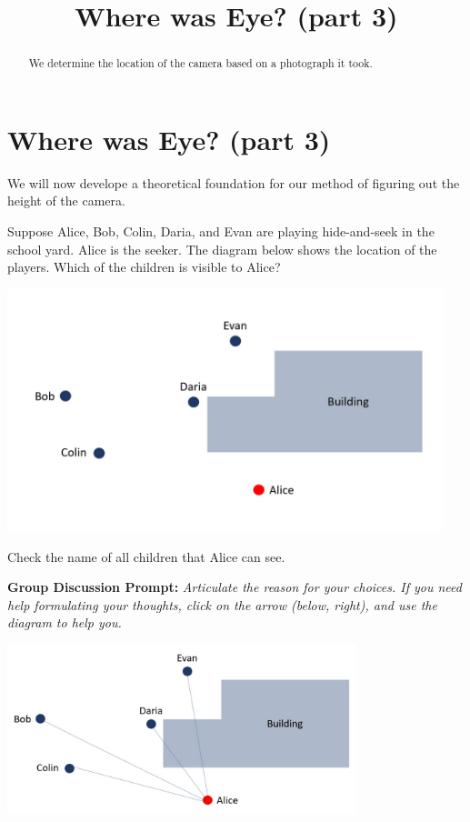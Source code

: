 \documentclass{ximera}
\title{Where was Eye? (part 3)} \license{CC BY-NC-SA 4.0}
\begin{document}
\begin{abstract}
We determine the location of the camera based on a photograph it took.
\end{abstract}
\maketitle

\section*{Where was Eye? (part 3)}


We will now develope a theoretical foundation for our method of figuring out the height of the camera. 

\begin{exploration}\label{exp:hideAndSeek}
Suppose Alice, Bob, Colin, Daria, and Evan are playing hide-and-seek in the school yard.  Alice is the seeker.  The diagram below shows the location of the players.  Which of the children is visible to Alice?
     \begin{image}
         \includegraphics[width=5in]{hideAndSeek1.jpg}
\end{image}
Check the name of all children that Alice can see.
\begin{selectAll}
\end{selectAll}

\textbf{Group Discussion Prompt:}
\emph{Articulate the reason for your choices.  If you need help formulating your thoughts, click on the arrow (below, right), and use the diagram to help you.}

\begin{expandable}
    \begin{image}
         \includegraphics[width=4in]{hideAndSeek2.jpg}
\end{image}
\end{expandable}
\end{exploration}
\end{document}
